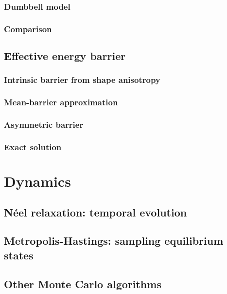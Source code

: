 \subsubsection{Dumbbell model}
\subsubsection{Comparison}
\subsection{Effective energy barrier}
\subsubsection{Intrinsic barrier from shape anisotropy}
\subsubsection{Mean-barrier approximation} %
\subsubsection{Asymmetric barrier}
\subsubsection{Exact solution} %

\section{Dynamics}
\subsection{N\'eel relaxation: temporal evolution}
\subsection{Metropolis-Hastings: sampling equilibrium states}
\subsection{Other Monte Carlo algorithms} %

